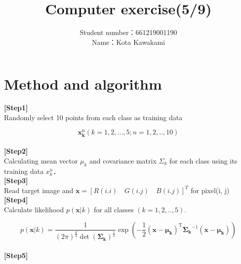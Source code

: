 \documentclass{jarticle}
\begin{document}
\begin{titlepage}
\title{Computer exercise(5/9)}
\author{
  Student number：661219001190   \\
  Name：Kota Kawakami
}
\end{titlepage}

\maketitle

\section{Method and algorithm}

{\bf [Step1]} \\

Randomly select 10 points from each class as training data 

\begin{equation}
  \mathbf{x}_{\mathbf{k}}^{\mathrm{n}}(k=1,2, \ldots, 5 ; n=1,2, . ., 10)
\end{equation}\\



{\bf [Step2]} \\

Calculating mean vector $\mu_{k}$ and covariance matrix $\Sigma_{k} $ for each class 
using its training data $x_{k}^{n}$．\\

{\bf [Step3]} \\

Read target image and
$\mathbf{x}=[R(i . i) \quad G(i . j) \quad B(i . j)]^{T}$ for pixel(i, j)\\
 

{\bf [Step4]}\\

Calculate likelihood $p(\mathbf{x}|k)$ for all classes $(k=1, 2,.., 5)$.
  
\begin{equation}
    p(\mathbf{x}|k)
    =\frac{1}{(2 \pi)^{\frac{d}{2}} \operatorname{det}(\boldsymbol{\Sigma_{k}})^{\frac{1}{2}}} 
    \exp \left(-\frac{1}{2}(\mathbf{x}-\boldsymbol{\mu_{k}})^{\mathrm{T}} 
    \boldsymbol{\Sigma_{k}}^{-1}(\mathbf{x}-\boldsymbol{\mu_{k}})\right)
  \end{equation}\\

{\bf [Step5]}\\
\end{document}
